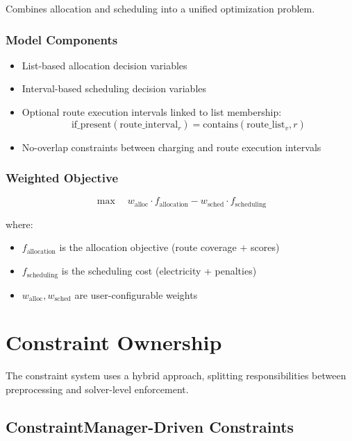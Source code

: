 \documentclass[11pt,a4paper]{article}
\begin{document}
Combines allocation and scheduling into a unified optimization problem.

\subsubsection{Model Components}

\begin{itemize}
    \item List-based allocation decision variables
    \item Interval-based scheduling decision variables
    \item Optional route execution intervals linked to list membership:
    \begin{equation}
    \text{if\_present}(\text{route\_interval}_r) = \text{contains}(\text{route\_list}_v, r)
    \end{equation}
    \item No-overlap constraints between charging and route execution intervals
\end{itemize}

\subsubsection{Weighted Objective}

\begin{equation}
\max \quad w_{\text{alloc}} \cdot f_{\text{allocation}} - w_{\text{sched}} \cdot f_{\text{scheduling}}
\end{equation}

where:
\begin{itemize}
    \item $f_{\text{allocation}}$ is the allocation objective (route coverage + scores)
    \item $f_{\text{scheduling}}$ is the scheduling cost (electricity + penalties)
    \item $w_{\text{alloc}}, w_{\text{sched}}$ are user-configurable weights
\end{itemize}

\section{Constraint Ownership}

The constraint system uses a hybrid approach, splitting responsibilities between preprocessing and solver-level enforcement.

\subsection{ConstraintManager-Driven Constraints}
\end{document}
